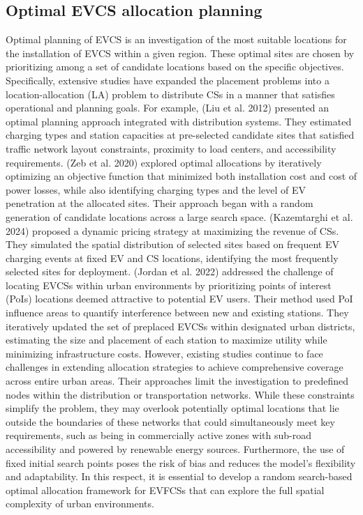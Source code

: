\documentclass[preprint,12pt]{elsarticle}
\begin{document}
\subsection{Optimal EVCS allocation planning}
Optimal planning of EVCS is an investigation of the most suitable locations for the installation of EVCS within a given region. These optimal sites are chosen by prioritizing among a set of candidate locations based on the specific objectives. Specifically, extensive studies have expanded the placement problems into a location-allocation (LA) problem to distribute CSs in a manner that satisfies operational and planning goals. For example, (Liu et al. 2012) \cite{Liu_wen2012} presented an optimal planning approach integrated with distribution systems. They estimated charging types and station capacities at pre-selected candidate sites that satisfied traffic network layout constraints, proximity to load centers, and accessibility requirements. (Zeb et al. 2020) \cite{Zeb2020} explored optimal allocations by iteratively optimizing an objective function that minimized both installation cost and cost of power losses, while also identifying charging types and the level of EV penetration at the allocated sites. Their approach began with a random generation of candidate locations across a large search space. (Kazemtarghi et al. 2024) \cite{Kazemt2024} proposed a dynamic pricing strategy at maximizing the revenue of CSs. They simulated the spatial distribution of selected sites based on frequent EV charging events at fixed EV and CS locations, identifying the most frequently selected sites for deployment. (Jordan et al. 2022) \cite{Jordan2022} addressed the challenge of locating EVCSs within urban environments by prioritizing points of interest (PoIs) locations deemed attractive to potential EV users. Their method used PoI influence areas to quantify interference between new and existing stations. They iteratively updated the set of preplaced EVCSs within designated urban districts, estimating the size and placement of each station to maximize utility while minimizing infrastructure costs. However, existing studies continue to face challenges in extending allocation strategies to achieve comprehensive coverage across entire urban areas. Their approaches limit the investigation to predefined nodes within the distribution or transportation networks. While these constraints simplify the problem, they may overlook potentially optimal locations that lie outside the boundaries of these networks that could simultaneously meet key requirements, such as being in commercially active zones with sub-road accessibility and powered by renewable energy sources. Furthermore, the use of fixed initial search points poses the risk of bias and reduces the model's flexibility and adaptability. In this respect, it is essential to develop a random search-based optimal allocation framework for EVFCSs that can explore the full spatial complexity of urban environments.  
\end{document}
